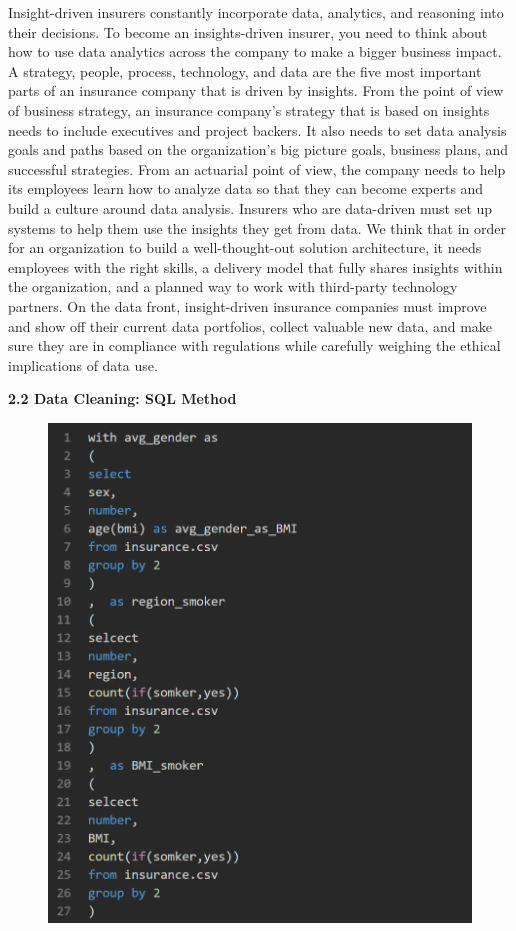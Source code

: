 \documentclass[journal]{IEEEtran}
\begin{document}
\par Insight-driven insurers constantly incorporate data, analytics, and reasoning into their decisions. To become an insights-driven insurer, you need to think about how to use data analytics across the company to make a bigger business impact. A strategy, people, process, technology, and data are the five most important parts of an insurance company that is driven by insights. From the point of view of business strategy, an insurance company's strategy that is based on insights needs to include executives and project backers. It also needs to set data analysis goals and paths based on the organization's big picture goals, business plans, and successful strategies. From an actuarial point of view, the company needs to help its employees learn how to analyze data so that they can become experts and build a culture around data analysis. Insurers who are data-driven must set up systems to help them use the insights they get from data. We think that in order for an organization to build a well-thought-out solution architecture, it needs employees with the right skills, a delivery model that fully shares insights within the organization, and a planned way to work with third-party technology partners. On the data front, insight-driven insurance companies must improve and show off their current data portfolios, collect valuable new data, and make sure they are in compliance with regulations while carefully weighing the ethical implications of data use.


\textbf{2.2 Data Cleaning: SQL Method}

\begin{figure}[h]
  \centering
  \includegraphics [width= 3.55 in]{13.png}
\caption{}
  \label{storage}
\end{figure}
\end{document}
